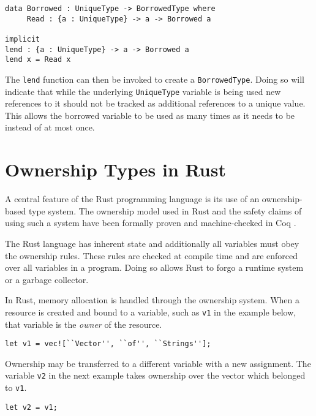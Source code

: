 \documentclass[onehalf,11pt]{beavtex}
\begin{document}
\begin{verbatim}
data Borrowed : UniqueType -> BorrowedType where
     Read : {a : UniqueType} -> a -> Borrowed a

implicit
lend : {a : UniqueType} -> a -> Borrowed a
lend x = Read x
\end{verbatim}

The \texttt{lend} function can then be invoked to create a \texttt{BorrowedType}.
Doing so will indicate that while the underlying \texttt{UniqueType} variable is
being used new references to it should not be tracked as additional references
to a unique value.  This allows the borrowed variable to be used as many times
as it needs to be instead of at most once. 


\section{Ownership Types in Rust}

A central feature of the Rust programming language is its use of an
ownership-based type system. The ownership model used in Rust and the
safety claims of using such a system have been formally proven and
machine-checked in Coq \cite{Jung:2017:RSF:3177123.3158154}.

The Rust language has inherent state and additionally all variables must obey the
ownership rules. %
These rules are checked at compile time and are enforced over all variables in
a program.
Doing so allows Rust to forgo a runtime system or a garbage collector.

In Rust, memory allocation is handled through the ownership system.
When a resource is created and bound to a variable, such as \texttt{v1} in the
example below, that variable is the \textit{owner} of the resource.

\begin{verbatim}
let v1 = vec![``Vector'', ``of'', ``Strings''];
\end{verbatim}

Ownership may be transferred to a different variable with a new assignment.
The variable \texttt{v2} in the next example takes ownership over the
vector which belonged to \texttt{v1}. 

\begin{verbatim}
let v2 = v1;
\end{verbatim}
\end{document}
